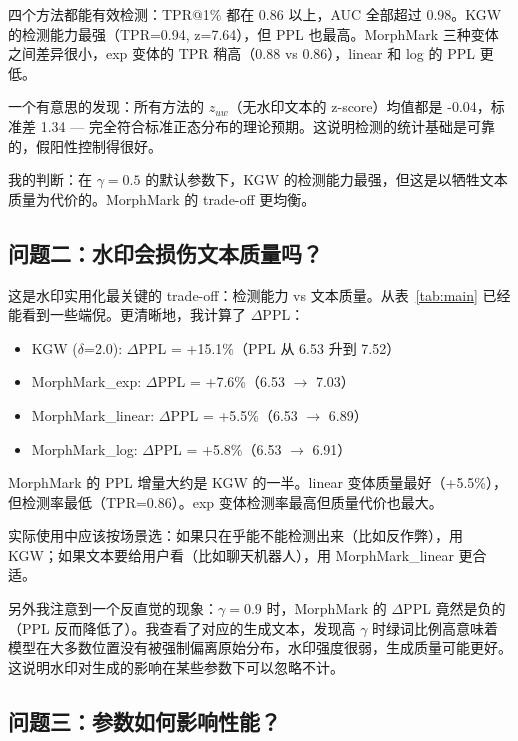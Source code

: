 \documentclass[11pt,a4paper]{article}
\begin{document}
四个方法都能有效检测：TPR@1\% 都在 0.86 以上，AUC 全部超过 0.98。KGW 的检测能力最强（TPR=0.94, z=7.64），但 PPL 也最高。MorphMark 三种变体之间差异很小，exp 变体的 TPR 稍高（0.88 vs 0.86），linear 和 log 的 PPL 更低。

一个有意思的发现：所有方法的 $z_{uw}$（无水印文本的 z-score）均值都是 -0.04，标准差 1.34 — 完全符合标准正态分布的理论预期。这说明检测的统计基础是可靠的，假阳性控制得很好。

我的判断：在 $\gamma=0.5$ 的默认参数下，KGW 的检测能力最强，但这是以牺牲文本质量为代价的。MorphMark 的 trade-off 更均衡。

\subsection{问题二：水印会损伤文本质量吗？}

这是水印实用化最关键的 trade-off：检测能力 vs 文本质量。从表~\ref{tab:main} 已经能看到一些端倪。更清晰地，我计算了 $\Delta$PPL：

\begin{itemize}[nosep]
  \item KGW ($\delta$=2.0): $\Delta$PPL = +15.1\%（PPL 从 6.53 升到 7.52）
  \item MorphMark\_exp: $\Delta$PPL = +7.6\%（6.53 $\rightarrow$ 7.03）
  \item MorphMark\_linear: $\Delta$PPL = +5.5\%（6.53 $\rightarrow$ 6.89）
  \item MorphMark\_log: $\Delta$PPL = +5.8\%（6.53 $\rightarrow$ 6.91）
\end{itemize}

MorphMark 的 PPL 增量大约是 KGW 的一半。linear 变体质量最好（+5.5\%），但检测率最低（TPR=0.86）。exp 变体检测率最高但质量代价也最大。

实际使用中应该按场景选：如果只在乎能不能检测出来（比如反作弊），用 KGW；如果文本要给用户看（比如聊天机器人），用 MorphMark\_linear 更合适。

另外我注意到一个反直觉的现象：$\gamma=0.9$ 时，MorphMark 的 $\Delta$PPL 竟然是负的（PPL 反而降低了）。我查看了对应的生成文本，发现高 $\gamma$ 时绿词比例高意味着模型在大多数位置没有被强制偏离原始分布，水印强度很弱，生成质量可能更好。这说明水印对生成的影响在某些参数下可以忽略不计。

\subsection{问题三：参数如何影响性能？}
\end{document}
